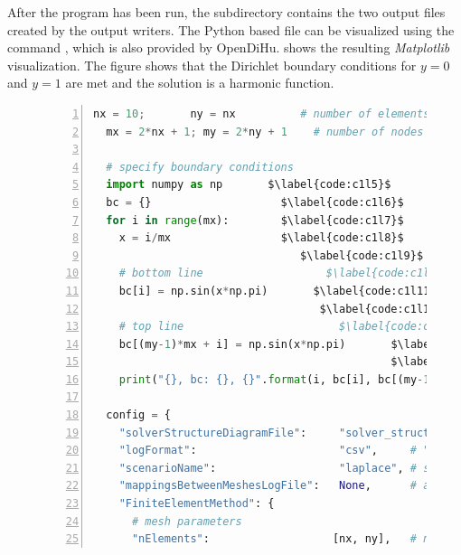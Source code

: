 After the program has been run, the  subdirectory contains the two output files created by the output writers. The Python based file can be visualized using the command , which is also provided by OpenDiHu.  shows the resulting \emph{Matplotlib} visualization. The figure shows that the Dirichlet boundary conditions for $y=0$ and $y=1$ are met and the solution is a harmonic function.

\begin{figure}
\centering
\begin{framed}
\begin{lstlisting}[basicstyle=\footnotesize\ttfamily,language=Python,commentstyle=\color{gray},numbers=left]
  nx = 10;       ny = nx          # number of elements   $\label{code:c1l1}$
  mx = 2*nx + 1; my = 2*ny + 1    # number of nodes    $\label{code:c1l2}$
                                                        $\label{code:c1l3}$
  # specify boundary conditions                         $\label{code:c1l4}$
  import numpy as np       $\label{code:c1l5}$
  bc = {}                    $\label{code:c1l6}$
  for i in range(mx):        $\label{code:c1l7}$
    x = i/mx                 $\label{code:c1l8}$
                                $\label{code:c1l9}$
    # bottom line                   $\label{code:c1l10}$
    bc[i] = np.sin(x*np.pi)       $\label{code:c1l11}$
                                   $\label{code:c1l12}$
    # top line                        $\label{code:c1l13}$
    bc[(my-1)*mx + i] = np.sin(x*np.pi)       $\label{code:c1l14}$
                                              $\label{code:c1l15}$
    print("{}, bc: {}, {}".format(i, bc[i], bc[(my-1)*mx + i]))       $\label{code:c1l16}$
                                                                             $\label{code:c1l17}$
  config = {                                                                      $\label{code:c1l18}$
    "solverStructureDiagramFile":     "solver_structure.txt",      # diagram file $\label{code:c1l19}$
    "logFormat":                      "csv",     # "csv" or "json", format of log $\label{code:c1l20}$
    "scenarioName":                   "laplace", # scenario name for log file     $\label{code:c1l21}$
    "mappingsBetweenMeshesLogFile":   None,      # a log file about mappings      $\label{code:c1l22}$
    "FiniteElementMethod": {                                                      $\label{code:c1l23}$
      # mesh parameters                                                           $\label{code:c1l24}$
      "nElements":                   [nx, ny],   # number of elements in x and y  $\label{code:c1l25}$

\end{lstlisting}
\end{framed}
\end{figure}
